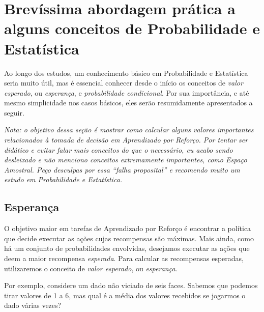 \documentclass{article}
\begin{document}
    \section{Brevíssima abordagem prática a alguns conceitos de Probabilidade e Estatística}
    \label{sec:probabilidade}
    
        Ao longo dos estudos, um conhecimento básico em Probabilidade e Estatística seria muito útil, mas é essencial conhecer desde o início os conceitos de \emph{valor esperado}, ou \emph{esperança}, e \emph{probabilidade condicional}.
        Por sua importância, e até mesmo simplicidade nos casos básicos, eles serão resumidamente apresentados a seguir.
        
        \textit{Nota: o objetivo dessa seção é mostrar como calcular alguns valores importantes relacionados à tomada de decisão em Aprendizado por Reforço. Por tentar ser didático e evitar falar mais conceitos do que o necessário, eu acabo sendo desleixado e não menciono conceitos extremamente importantes, como \emph{Espaço Amostral}. Peço desculpas por essa ``falha proposital'' e recomendo muito um estudo em Probabilidade e Estatística.}
            
        \subsection{Esperança}
            
            O objetivo maior em tarefas de Aprendizado por Reforço é encontrar a política que decide executar as ações cujas recompensas são máximas.
            Mais ainda, como há um conjunto de probabilidades envolvidas, desejamos executar as ações que deem a maior recompensa \emph{esperada}.
            Para calcular as recompensas esperadas, utilizaremos o conceito de \emph{valor esperado}, ou \emph{esperança}.
            
            Por exemplo, considere um dado não viciado de seis faces.
            Sabemos que podemos tirar valores de 1 a 6, mas qual é a média dos valores recebidos se jogarmos o dado várias vezes?
            
\end{document}
